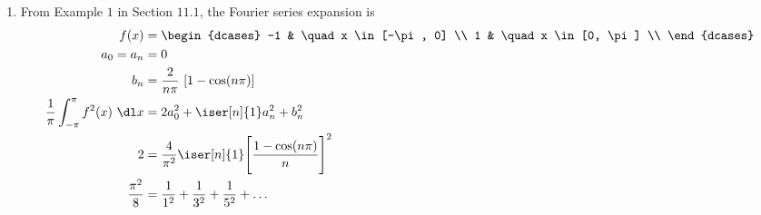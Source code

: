 \begin{enumerate}
    \item From Example $ 1 $ in Section $ 11.1 $, the Fourier series expansion is
          \begin{align}
              f(x)            & = \begin{dcases}
                                      -1 & \quad x \in [-\pi, 0] \\
                                      1  & \quad x \in [0, \pi]  \\
                                  \end{dcases}                    \\
              a_0 = a_n       & = 0                                             \\
              b_n             & = \frac{2}{n\pi}\ [1 - \cos(n\pi)]              \\
              \frac{1}{\pi} \int_{-\pi}^{\pi}
              f^2(x)\ \dl x   & = 2a_0^2 + \iser[n]{1} a_n^2 + b_n^2            \\
              2               & = \frac{4}{\pi^2} \iser[n]{1}
              \Bigg[\frac{1 - \cos(n\pi)}{n}\Bigg]^2                            \\
              \frac{\pi^2}{8} & = \frac{1}{1^2} + \frac{1}{3^2} + \frac{1}{5^2}
              + \dots
          \end{align}
\end{enumerate}
